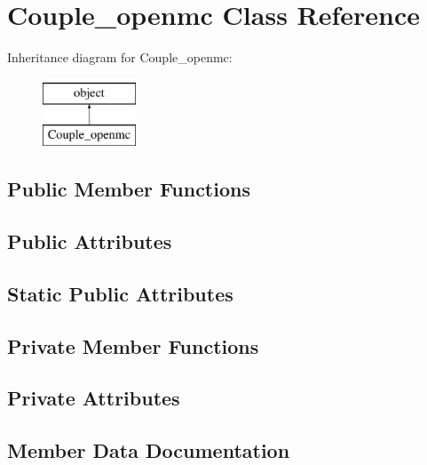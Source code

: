 \hypertarget{classopenbu_1_1couple_1_1couple__openmc_1_1_couple__openmc}{}\section{Couple\+\_\+openmc Class Reference}
\label{classopenbu_1_1couple_1_1couple__openmc_1_1_couple__openmc}
Inheritance diagram for Couple\+\_\+openmc\+:\begin{figure}[H]
\begin{center}
\leavevmode
\includegraphics[height=2.000000cm]{classopenbu_1_1couple_1_1couple__openmc_1_1_couple__openmc}
\end{center}
\end{figure}
\subsection*{Public Member Functions}
\subsection*{Public Attributes}
\subsection*{Static Public Attributes}
\subsection*{Private Member Functions}
\subsection*{Private Attributes}


\subsection{Member Data Documentation}
\mbox{\label{classopenbu_1_1couple_1_1couple__openmc_1_1_couple__openmc_a3fbc39b83e843c3b96bca920ed45a927}} 
